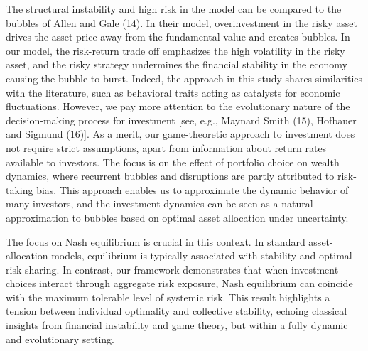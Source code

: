 \documentclass[11pt,a4paper]{article}
\begin{document}
The structural instability and high risk in the model can be compared to the bubbles of Allen and Gale (14). In their model, overinvestment in the risky asset drives the asset price away from the fundamental value and creates bubbles. In our model, the risk-return trade off emphasizes the high volatility in the risky asset, and the risky strategy undermines the financial stability in the economy causing the bubble to burst. Indeed, the approach in this study shares similarities with the literature, such as behavioral traits acting as catalysts for economic fluctuations. However, we pay more attention to the evolutionary nature of the decision-making process for investment [see, e.g., Maynard Smith (15), Hofbauer and Sigmund (16)]. As a merit, our game-theoretic approach to investment does not require strict assumptions, apart from information about return rates available to investors. The focus is on the effect of portfolio choice on wealth dynamics, where recurrent bubbles and disruptions are partly attributed to risk-taking bias. This approach enables us to approximate the dynamic behavior of many investors, and the investment dynamics can be seen as a natural approximation to bubbles based on optimal asset allocation under uncertainty.


The focus on Nash equilibrium is crucial in this context. In standard asset-allocation models, equilibrium is typically associated with stability and optimal risk sharing. In contrast, our framework demonstrates that when investment choices interact through aggregate risk exposure, Nash equilibrium can coincide with the maximum tolerable level of systemic risk. This result highlights a tension between individual optimality and collective stability, echoing classical insights from financial instability and game theory, but within a fully dynamic and evolutionary setting. 





\end{document}
